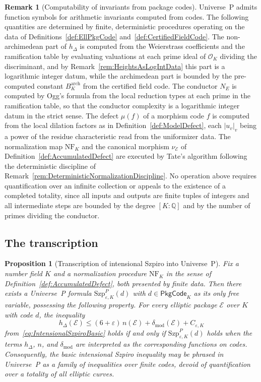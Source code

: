 \documentclass[10pt, reqno]{amsart}
\theoremstyle{plain}
\newtheorem{proposition}[theorem]{Proposition}
\theoremstyle{definition}
\newtheorem{remark}[theorem]{Remark}
\theoremstyle{plain}
\newcommand{\Q}{\mathbb{Q}}
\newcommand{\defect}{\delta_{\mathrm{mod}}}
\begin{document}
\begin{remark}[Computability of invariants from package codes]\label{rem:PkgCodeComputability}
Universe~P admits function symbols for arithmetic invariants computed from codes. The following quantities are determined by finite, deterministic procedures operating on the data of Definitions~\ref{def:EllPkgCode} and~\ref{def:CertifiedFieldCode}. The non-archimedean part of $h_\Delta$ is computed from the Weierstrass coefficients and the ramification table by evaluating valuations at each prime ideal of $\mathcal{O}_K$ dividing the discriminant, and by Remark~\ref{rem:HeightsAsLogIntData} this part is a logarithmic integer datum, while the archimedean part is bounded by the pre-computed constant $B_K^{\mathrm{arch}}$ from the certified field code. The conductor $N_E$ is computed by Ogg's formula from the local reduction types at each prime in the ramification table, so that the conductor complexity is a logarithmic integer datum in the strict sense. The defect $\mu(f)$ of a morphism code $f$ is computed from the local dilation factors as in Definition~\ref{def:ModelDefect}, each $|u_v|_v$ being a power of the residue characteristic read from the uniformizer data. The normalization map $\mathrm{NF}_K$ and the canonical morphism $\nu_{\mathcal{E}}$ of Definition~\ref{def:AccumulatedDefect} are executed by Tate's algorithm following the deterministic discipline of Remark~\ref{rem:DeterministicNormalizationDiscipline}. No operation above requires quantification over an infinite collection or appeals to the existence of a completed totality, since all inputs and outputs are finite tuples of integers and all intermediate steps are bounded by the degree $[K:\Q]$ and by the number of primes dividing the conductor.
\end{remark}

\subsection{The transcription}\label{subsec:Transcription}

\begin{proposition}[Transcription of intensional Szpiro into Universe~P]\label{prop:APDescentToP}
Fix a number field $K$ and a normalization procedure $\mathrm{NF}_K$ in the sense of Definition~\ref{def:AccumulatedDefect}, both presented by finite data. Then there exists a Universe~P formula $\mathrm{Szp}^P_{\varepsilon,K}(d)$ with $d \in \mathsf{PkgCode}_K$ as its only free variable, possessing the following property. For every elliptic package $\mathcal{E}$ over $K$ with code $d$, the inequality
\[
h_\Delta(\mathcal{E})
\le
(6+\varepsilon)\,n(\mathcal{E})
+
\defect(\mathcal{E})
+
C_{\varepsilon,K}
\]
from~\eqref{eq:IntensionalSzpiroBasic} holds if and only if $\mathrm{Szp}^P_{\varepsilon,K}(d)$ holds when the terms $h_\Delta$, $n$, and $\defect$ are interpreted as the corresponding functions on codes. Consequently, the basic intensional Szpiro inequality may be phrased in Universe~P as a family of inequalities over finite codes, devoid of quantification over a totality of all elliptic curves.
\end{proposition}
\end{document}
